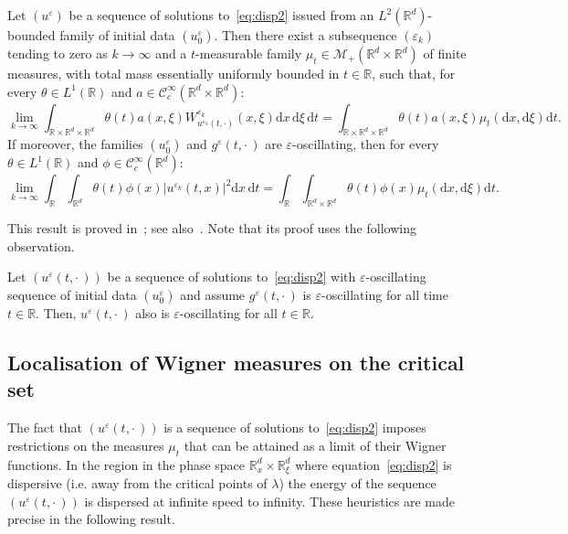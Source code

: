 \documentclass[AHL,Unicode,longabstracts]{cedram}
\newcommand*\R{{\mathbb R}}
\newcommand*\eps{\varepsilon}
\numberwithin{equation}{section}
\newcommand*{\dd}{\mathrm{d}}
\newcommand*{\dt}{\dd t}
\newcommand*{\dx}{\dd x}
\newcommand*{\dxi}{\dd \xi}
\begin{document}
\begin{prop}\label{prop:msc}
Let $(u^{\eps})$ be a sequence of solutions to~\eqref{eq:disp2} issued from an $L^2(\R^d)$-bounded family of initial data $(u^\eps_0)$. Then there exist a subsequence $(\eps_k)$ tending to zero as $k\to\infty$ and a $t$-measurable family $\mu_t\in\mathcal{M}_+(\R^d\times\R^d)$ of finite measures, with total mass essentially uniformly bounded in $t\in\R$, such that, for every $\theta\in L^1(\R)$ and $a\in\mathcal{C}^\infty_c(\R^d\times\R^d)$:
\[
\lim_{k\to\infty}\int_{\R\times\R^d\times\R^d} \theta(t) a(x,\xi)W_{u^{\eps_k}(t,\cdot)}^{\eps_k}(x,\xi)\dx\,\dxi\, \dt=\int_{\R\times\R^d\times\R^d}\theta(t)a(x,\xi)\mu_t(\dx,\dxi)\dt.
\]
If moreover, the families $(u^\eps_0)$ and $g^\eps(t,\cdot\,)$ are $\eps$-oscillating, then for every $\theta\in L^1(\R)$ and $\phi\in {\mathcal C}_c^\infty(\R^d)$:
\[
\lim_{k\to\infty}\int_\R\int_{\R^d} \theta(t) \phi(x)|u^{\eps_{k}}(t,x)|^2 \dx \,\dt=\int_\R\int_{\R^d\times\R^d} \theta(t)\phi(x) \mu_t(\dx,\dxi) \dt.
\]
\end{prop}



This result is proved in~\cite[Theorem~1]{MaciaAv}; see also~\cite[Appendix~B]{MR:16}. Note that its proof uses the following observation.

\begin{rema}\label{remark:tx}
Let $(u^{\eps}(t,\cdot\,))$ be a sequence of solutions to~\eqref{eq:disp2} with $\eps$-oscillating sequence of initial data $(u^\eps_0)$ and assume $g^\eps(t,\cdot\,)$ is $\eps$-oscillating for all time $t\in\R$. Then, $u^\eps(t,\cdot\,)$ also is $\eps$-oscillating for all $t\in\R$.
\end{rema}



\subsection{Localisation of Wigner measures on the critical set}


The fact that $(u^{\eps}(t,\cdot\,))$ is a sequence of solutions to~\eqref{eq:disp2} imposes restrictions on the measures $\mu_t$ that can be attained as a limit of their Wigner functions. In the region in the phase space $\R^d_x\times\R^d_\xi$ where equation~\eqref{eq:disp2} is dispersive (i.e. away from the critical points of $\lambda$) the energy of the sequence $(u^\eps(t,\cdot\,))$ is dispersed at infinite speed to infinity. These heuristics are made precise in the following result.
\end{document}
